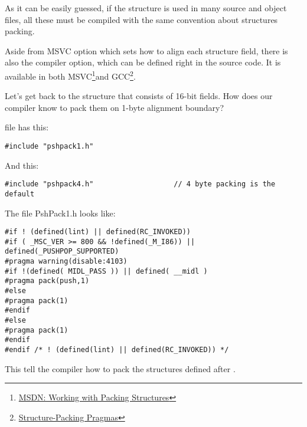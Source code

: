 As it can be easily guessed, if the structure is used in many source and object files,
all these must be compiled with the same convention about structures packing.

\newcommand{\FNURLMSDNZP}{\footnote{\href{http://go.yurichev.com/17067}
{MSDN: Working with Packing Structures}}}
\newcommand{\FNURLGCCPC}{\footnote{\href{http://go.yurichev.com/17068}
{Structure-Packing Pragmas}}}

Aside from MSVC  option which sets how to align each structure field, there is also
the  compiler option, which can be defined right in the source code.
It is available in both MSVC\FNURLMSDNZP and GCC\FNURLGCCPC{}.

Let's get back to the  structure that consists of 16-bit fields.
How does our compiler know to pack them on 1-byte alignment boundary?

 file has this:

\begin{lstlisting}[caption=WinNT.h,style=customc]
#include "pshpack1.h"
\end{lstlisting}

And this:

\begin{lstlisting}[caption=WinNT.h,style=customc]
#include "pshpack4.h"                   // 4 byte packing is the default
\end{lstlisting}

The file PshPack1.h looks like:

\begin{lstlisting}[caption=PshPack1.h,style=customc]
#if ! (defined(lint) || defined(RC_INVOKED))
#if ( _MSC_VER >= 800 && !defined(_M_I86)) || defined(_PUSHPOP_SUPPORTED)
#pragma warning(disable:4103)
#if !(defined( MIDL_PASS )) || defined( __midl )
#pragma pack(push,1)
#else
#pragma pack(1)
#endif
#else
#pragma pack(1)
#endif
#endif /* ! (defined(lint) || defined(RC_INVOKED)) */
\end{lstlisting}

This tell the compiler how to pack the structures defined after .


